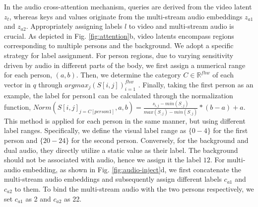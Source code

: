 \documentclass{article}
\begin{document}

In the audio cross-attention mechanism, queries are derived from the video latent $z_t$, whereas keys and values originate from the multi-stream audio embeddings $z_{a1}$ and $z_{a2}$. Appropriately assigning labels $l$ to video and multi-stream audio is crucial.
As depicted in Fig. \ref{fig:attention}b, video latents encompass regions corresponding to multiple persons and the background. We adopt a specific strategy for label assignment.
For person regions, due to varying sensitivity driven by audio in different parts of the body, we first assign a numerical range for each person, $(a,b)$. Then, we determine the category $C \in \mathbb{R}^{fhw}$ of each vector in $q$ through $argmax_j(S\left [i,j  \right ])_{i=1}^{fhw}$ . Finally, taking the first person as an example, the label for person1 can be calculated through the normalization function, $Norm(S\left [i,j  \right ]_{j=C[person1]}, a, b)=\frac{s_{i,j}-min(S_{,j})}{max(S_{,j})-min(S_{,j})}*(b-a)+a$.
This method is applied for each person in the same manner, but using different label ranges. Specifically, we define the visual label range as $\{0-4\}$ for the first person and $\{20-24\}$ for the second person.
Conversely, for the background and dual audio, they directly utilize a static value as their label. The background should not be associated with audio, hence we assign it the label $12$. For multi-audio embedding, as shown in Fig. \ref{fig:audio-inject}d, we first concatenate the multi-stream audio embeddings and subsequently assign different labels $c_{a1}$ and $c_{a2}$ to them. To bind the multi-stream audio with the two persons respectively, we set $c_{a1}$ as 2 and $c_{a2}$ as 22.

\end{document}
